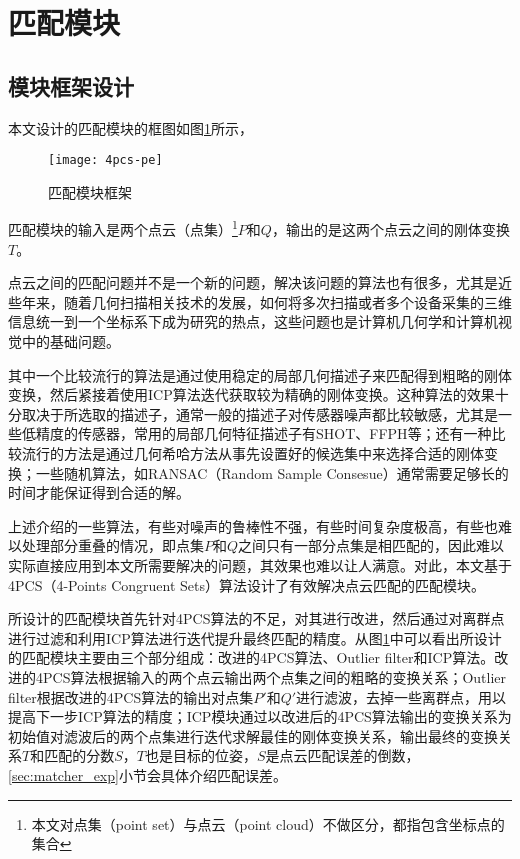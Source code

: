 \section{匹配模块}
\label{sec:matcher}

\subsection{模块框架设计}
本文设计的匹配模块的框图如图\ref{fig:4pcs-pe}所示，
\begin{figure}[ht]
  \centering
  \texttt{[image: 4pcs-pe]}
  \caption{匹配模块框架}
  \label{fig:4pcs-pe}
\end{figure}
匹配模块的输入是两个点云（点集）\footnote{本文对点集（point set）与点云（point cloud）不做区分，都指包含坐标点的集合}$P$和$Q$，输出的是这两个点云之间的刚体变换$T$。

点云之间的匹配问题并不是一个新的问题，解决该问题的算法也有很多，尤其是近些年来，随着几何扫描相关技术的发展，如何将多次扫描或者多个设备采集的三维信息统一到一个坐标系下成为研究的热点，这些问题也是计算机几何学和计算机视觉中的基础问题。

其中一个比较流行的算法是通过使用稳定的局部几何描述子来匹配得到粗略的刚体变换，然后紧接着使用ICP算法\cite{besl1992method}迭代获取较为精确的刚体变换\cite{li2005multiscale}。这种算法的效果十分取决于所选取的描述子，通常一般的描述子对传感器噪声都比较敏感，尤其是一些低精度的传感器，常用的局部几何特征描述子有SHOT\cite{salti2014shot}、FFPH\cite{rusu2009fast}等；还有一种比较流行的方法是通过几何希哈方法从事先设置好的候选集中来选择合适的刚体变换\cite{wolfson1997geometric}；一些随机算法，如RANSAC（Random Sample Consesue）\cite{bolles1981ransac}通常需要足够长的时间才能保证得到合适的解。

上述介绍的一些算法，有些对噪声的鲁棒性不强，有些时间复杂度极高，有些也难以处理部分重叠的情况，即点集$P$和$Q$之间只有一部分点集是相匹配的，因此难以实际直接应用到本文所需要解决的问题，其效果也难以让人满意。对此，本文基于4PCS（4-Points Congruent Sets）算法设计了有效解决点云匹配的匹配模块。

所设计的匹配模块首先针对4PCS算法的不足，对其进行改进，然后通过对离群点进行过滤和利用ICP算法进行迭代提升最终匹配的精度。从图\ref{fig:4pcs-pe}中可以看出所设计的匹配模块主要由三个部分组成：改进的4PCS算法、Outlier filter和ICP算法。改进的4PCS算法根据输入的两个点云输出两个点集之间的粗略的变换关系；Outlier filter根据改进的4PCS算法的输出对点集$P'$和$Q'$进行滤波，去掉一些离群点，用以提高下一步ICP算法的精度；ICP模块通过以改进后的4PCS算法输出的变换关系为初始值对滤波后的两个点集进行迭代求解最佳的刚体变换关系，输出最终的变换关系$T$和匹配的分数$S$，$T$也是目标的位姿，$S$是点云匹配误差的倒数，\ref{sec:matcher_exp}小节会具体介绍匹配误差。

